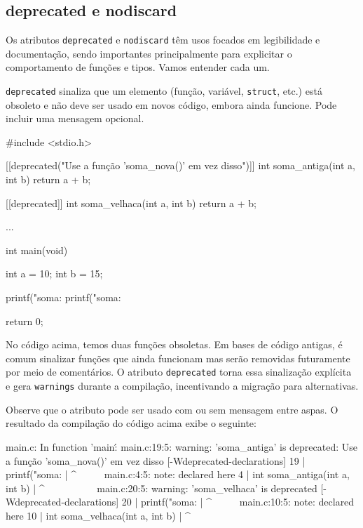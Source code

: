 \subsection{deprecated e nodiscard}

Os atributos \texttt{deprecated} e \texttt{nodiscard} têm usos focados 
em legibilidade e documentação, sendo importantes principalmente para explicitar 
o comportamento de funções e tipos. Vamos entender cada um.

\texttt{deprecated} sinaliza que um elemento (função, variável, 
\texttt{struct}, etc.) está obsoleto e não deve ser usado em novos código, 
embora ainda funcione. Pode incluir uma mensagem opcional.

\begin{excode}
#include <stdio.h>

[[deprecated("Use a função 'soma_nova()' em vez disso")]]
int soma_antiga(int a, int b)
{
    return a + b;
}

[[deprecated]]
int soma_velhaca(int a, int b)
{
    return a + b;
}

...

int main(void) {
    int a = 10;
    int b = 15;

    printf("soma: %
    printf("soma: %

    return 0;
}
\end{excode}

No código acima, temos duas funções obsoletas. Em bases de código antigas, é 
comum sinalizar funções que ainda funcionam mas serão removidas futuramente por 
meio de comentários. O atributo \texttt{deprecated} torna essa sinalização 
explícita e gera \texttt{warnings} durante a compilação, incentivando a migração 
para alternativas.

Observe que o atributo pode ser usado com ou sem mensagem entre aspas. O 
resultado da compilação do código acima exibe o seguinte:

\newpage
\begin{textbox}
main.c: In function 'main\':                                                                                                                                                                       
main.c:19:5: warning: 'soma_antiga' is deprecated: Use a função
    'soma_nova()' em vez disso [-Wdeprecated-declarations]
   19 |     printf("soma: %
      |     ^~~~~~
main.c:4:5: note: declared here
    4 | int soma_antiga(int a, int b)
      |     ^~~~~~~~~~~
main.c:20:5: warning: 'soma_velhaca' is deprecated
    [-Wdeprecated-declarations]
   20 |     printf("soma: %
      |     ^~~~~~
main.c:10:5: note: declared here                                                                                                                                                                  
   10 | int soma_velhaca(int a, int b)
      |     ^~~~~~~~~~~~
\end{textbox}

